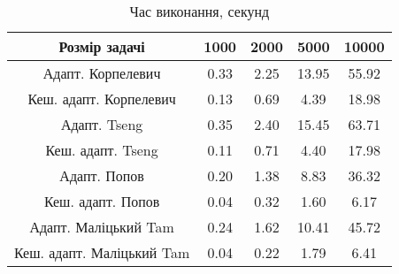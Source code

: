 \begin{table}[H]
	\centering
	\begin{tabular}{|c||c|c|c|c|}\hline
		Розмір задачі & 1000 & 2000 & 5000 & 10000 \\ \hline \hline
		Адапт. Корпелевич & 0.33 & 2.25 & 13.95 & 55.92 \\ \hline
		Кеш. адапт. Корпелевич & 0.13 & 0.69 & 4.39 & 18.98 \\ \hline
		Адапт. Tseng & 0.35 & 2.40 & 15.45 & 63.71 \\ \hline
		Кеш. адапт. Tseng & 0.11 & 0.71 & 4.40 & 17.98 \\ \hline
		Адапт. Попов & 0.20 & 1.38 & 8.83 & 36.32 \\ \hline
		Кеш. адапт. Попов & 0.04 & 0.32 & 1.60 & 6.17 \\ \hline
		Адапт. Маліцький Tam & 0.24 & 1.62 & 10.41 & 45.72 \\ \hline
		Кеш. адапт. Маліцький Tam & 0.04 & 0.22 & 1.79 & 6.41 \\ \hline
	\end{tabular}
	\caption{Час виконання, секунд}
\end{table}
